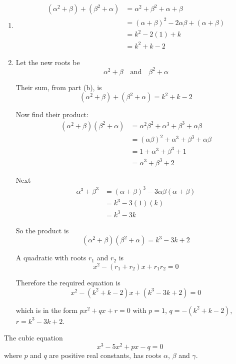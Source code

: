 \documentclass[leqno]{article}
\begin{document}
\begin{enumerate}[
  label=\textbf{\arabic*.},
  leftmargin=*,
  topsep=0pt,
  partopsep=0pt,
  parsep=0pt
]
\begin{djsSolution}
\begin{enumerate}[label=\textbf{(\alph*)}]
  For \(x^2-kx+1=0\) these give
  \[
  \alpha+\beta=-\frac{-k}{1}=k,
  \qquad
  \alpha\beta=\frac{1}{1}=1
  \]

  \item
  \begin{align*}
  (\alpha^2+\beta)+(\beta^2+\alpha)
  &=\alpha^2+\beta^2+\alpha+\beta\\
  &=(\alpha+\beta)^2-2\alpha\beta+(\alpha+\beta)\\
  &=k^2-2(1)+k\\
  &=k^2+k-2
  \end{align*}

  \item Let the new roots be
  \[
  \alpha^2+\beta \quad \text{and} \quad \beta^2+\alpha
  \]

  Their sum, from part (b), is
  \[
  (\alpha^2+\beta)+(\beta^2+\alpha)=k^2+k-2
  \]

  Now find their product:
  \begin{align*}
  (\alpha^2+\beta)(\beta^2+\alpha)
  &=\alpha^2\beta^2+\alpha^3+\beta^3+\alpha\beta\\
  &=(\alpha\beta)^2+\alpha^3+\beta^3+\alpha\beta\\
  &=1+\alpha^3+\beta^3+1\\
  &=\alpha^3+\beta^3+2
  \end{align*}

  Next
  \begin{align*}
  \alpha^3+\beta^3
  &=(\alpha+\beta)^3-3\alpha\beta(\alpha+\beta)\\
  &=k^3-3(1)(k)\\
  &=k^3-3k
  \end{align*}

  So the product is
  \[
  (\alpha^2+\beta)(\beta^2+\alpha)=k^3-3k+2
  \]

  A quadratic with roots \(r_1\) and \(r_2\) is
  \[
  x^2-(r_1+r_2)x+r_1r_2=0
  \]

  Therefore the required equation is
  \[
  x^2-(k^2+k-2)x+(k^3-3k+2)=0
  \]

  which is in the form \(px^2+qx+r=0\) with \(p=1\), \(q=-(k^2+k-2)\), \(r=k^3-3k+2\).
\end{enumerate}
\end{djsSolution}


\newpage

\questionitem

The cubic equation
\[
x^3 - 5x^2 + px - q = 0
\]
where $p$ and $q$ are positive real constants, has roots $\alpha$, $\beta$ and $\gamma$. \\


\end{enumerate}
\end{document}
